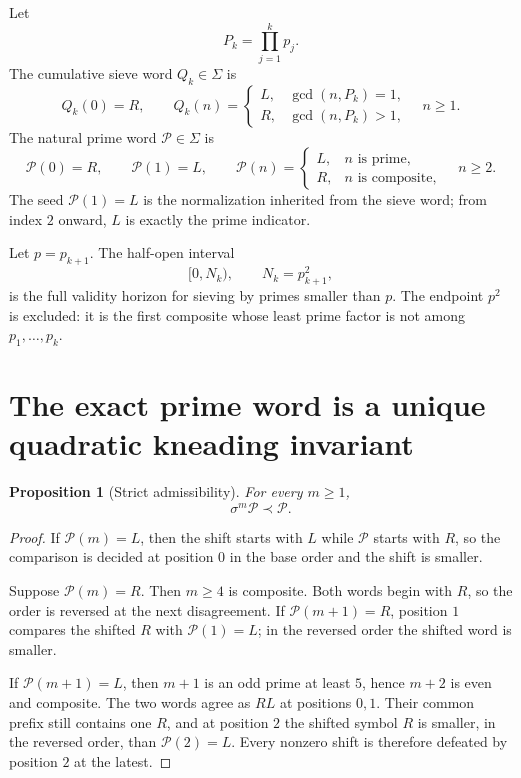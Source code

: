 \documentclass[11pt]{article}
\newtheorem{proposition}[theorem]{Proposition}
\theoremstyle{definition}
\theoremstyle{remark}
\newcommand{\cP}{\mathcal{P}}
\newcommand{\Sig}{\Sigma}
\newcommand{\sh}{\sigma}
\begin{document}
Let
\[
    P_k=\prod_{j=1}^k p_j.
\]
The cumulative sieve word $Q_k\in\Sig$ is
\begin{equation}\label{eq:Qk}
    Q_k(0)=R,
    \qquad
    Q_k(n)=
    \begin{cases}
        L,&\gcd(n,P_k)=1,\\
        R,&\gcd(n,P_k)>1,
    \end{cases}
    \quad n\ge1.
\end{equation}
The natural prime word $\cP\in\Sig$ is
\begin{equation}\label{eq:prime-word}
    \cP(0)=R,
    \qquad \cP(1)=L,
    \qquad
    \cP(n)=
    \begin{cases}
        L,&n\text{ is prime},\\
        R,&n\text{ is composite},
    \end{cases}
    \quad n\ge2.
\end{equation}
The seed $\cP(1)=L$ is the normalization inherited from the sieve word; from index $2$ onward, $L$ is exactly the prime indicator.

Let $p=p_{k+1}$.  The half-open interval
\begin{equation}\label{eq:physical-horizon}
    [0,N_k),\qquad N_k=p_{k+1}^2,
\end{equation}
is the full validity horizon for sieving by primes smaller than $p$.  The endpoint $p^2$ is excluded: it is the first composite whose least prime factor is not among $p_1,\ldots,p_k$.

\section{The exact prime word is a unique quadratic kneading invariant}

\begin{proposition}[Strict admissibility]\label{prop:prime-admissible}
For every $m\ge1$,
\[
    \sh^m\cP\prec\cP.
\]
\end{proposition}

\begin{proof}
If $\cP(m)=L$, then the shift starts with $L$ while $\cP$ starts with $R$, so the comparison is decided at position $0$ in the base order and the shift is smaller.

Suppose $\cP(m)=R$.  Then $m\ge4$ is composite.  Both words begin with $R$, so the order is reversed at the next disagreement.  If $\cP(m+1)=R$, position $1$ compares the shifted $R$ with $\cP(1)=L$; in the reversed order the shifted word is smaller.

If $\cP(m+1)=L$, then $m+1$ is an odd prime at least $5$, hence $m+2$ is even and composite.  The two words agree as $RL$ at positions $0,1$.  Their common prefix still contains one $R$, and at position $2$ the shifted symbol $R$ is smaller, in the reversed order, than $\cP(2)=L$.  Every nonzero shift is therefore defeated by position $2$ at the latest.
\end{proof}
\end{document}
